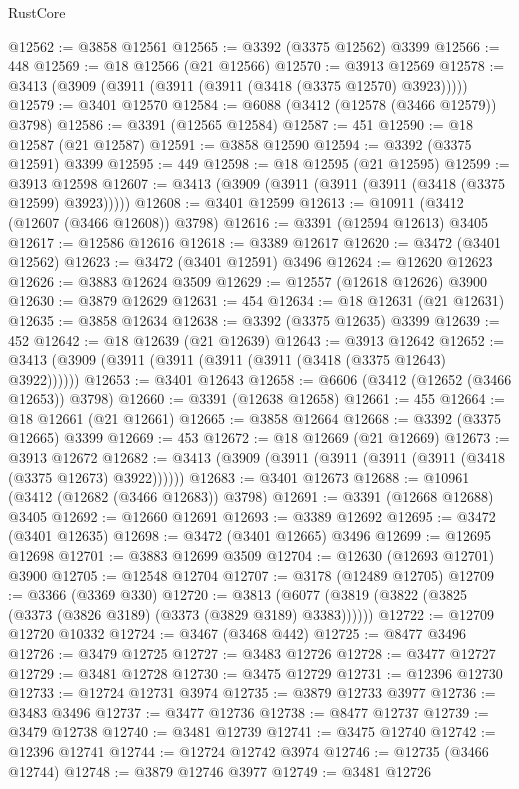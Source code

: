\begin{lexlean}{RustCore}
\begin{coremodule}
@12562 := @3858 @12561
@12565 := @3392 (@3375 @12562) @3399
@12566 := 448
@12569 := @18 @12566 (@21 @12566)
@12570 := @3913 @12569
@12578 := @3413 (@3909 (@3911 (@3911 (@3911 (@3418 (@3375 @12570) @3923)))))
@12579 := @3401 @12570
@12584 := @6088 (@3412 (@12578 (@3466 @12579)) @3798)
@12586 := @3391 (@12565 @12584)
@12587 := 451
@12590 := @18 @12587 (@21 @12587)
@12591 := @3858 @12590
@12594 := @3392 (@3375 @12591) @3399
@12595 := 449
@12598 := @18 @12595 (@21 @12595)
@12599 := @3913 @12598
@12607 := @3413 (@3909 (@3911 (@3911 (@3911 (@3418 (@3375 @12599) @3923)))))
@12608 := @3401 @12599
@12613 := @10911 (@3412 (@12607 (@3466 @12608)) @3798)
@12616 := @3391 (@12594 @12613) @3405
@12617 := @12586 @12616
@12618 := @3389 @12617
@12620 := @3472 (@3401 @12562)
@12623 := @3472 (@3401 @12591) @3496
@12624 := @12620 @12623
@12626 := @3883 @12624 @3509
@12629 := @12557 (@12618 @12626) @3900
@12630 := @3879 @12629
@12631 := 454
@12634 := @18 @12631 (@21 @12631)
@12635 := @3858 @12634
@12638 := @3392 (@3375 @12635) @3399
@12639 := 452
@12642 := @18 @12639 (@21 @12639)
@12643 := @3913 @12642
@12652 := @3413 (@3909 (@3911 (@3911 (@3911 (@3911 (@3418 (@3375 @12643) @3922))))))
@12653 := @3401 @12643
@12658 := @6606 (@3412 (@12652 (@3466 @12653)) @3798)
@12660 := @3391 (@12638 @12658)
@12661 := 455
@12664 := @18 @12661 (@21 @12661)
@12665 := @3858 @12664
@12668 := @3392 (@3375 @12665) @3399
@12669 := 453
@12672 := @18 @12669 (@21 @12669)
@12673 := @3913 @12672
@12682 := @3413 (@3909 (@3911 (@3911 (@3911 (@3911 (@3418 (@3375 @12673) @3922))))))
@12683 := @3401 @12673
@12688 := @10961 (@3412 (@12682 (@3466 @12683)) @3798)
@12691 := @3391 (@12668 @12688) @3405
@12692 := @12660 @12691
@12693 := @3389 @12692
@12695 := @3472 (@3401 @12635)
@12698 := @3472 (@3401 @12665) @3496
@12699 := @12695 @12698
@12701 := @3883 @12699 @3509
@12704 := @12630 (@12693 @12701) @3900
@12705 := @12548 @12704
@12707 := @3178 (@12489 @12705)
@12709 := @3366 (@3369 @330)
@12720 := @3813 (@6077 (@3819 (@3822 (@3825 (@3373 (@3826 @3189) (@3373 (@3829 @3189) @3383))))))
@12722 := @12709 @12720 @10332
@12724 := @3467 (@3468 @442)
@12725 := @8477 @3496
@12726 := @3479 @12725
@12727 := @3483 @12726
@12728 := @3477 @12727
@12729 := @3481 @12728
@12730 := @3475 @12729
@12731 := @12396 @12730
@12733 := @12724 @12731 @3974
@12735 := @3879 @12733 @3977
@12736 := @3483 @3496
@12737 := @3477 @12736
@12738 := @8477 @12737
@12739 := @3479 @12738
@12740 := @3481 @12739
@12741 := @3475 @12740
@12742 := @12396 @12741
@12744 := @12724 @12742 @3974
@12746 := @12735 (@3466 @12744)
@12748 := @3879 @12746 @3977
@12749 := @3481 @12726

\end{coremodule}
\end{lexlean}

